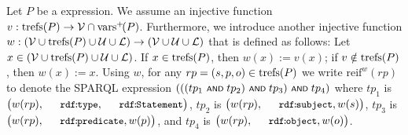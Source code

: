 Let $P$ be a {\SPARQLplus} expression. We assume an  injective function $v : \mathrm{trefs}(P) \rightarrow \mathcal{V} \cap \mathrm{vars}^+\!(P)$. Furthermore, we introduce another injective function $w : (\mathcal{V} \cup \mathrm{trefs}(P) \cup \mathcal{U} \cup \mathcal{L}) \rightarrow (\mathcal{V} \cup \mathcal{U} \cup \mathcal{L})$ that is defined as follows: Let $x \in (\mathcal{V} \cup \mathrm{trefs}(P) \cup \mathcal{U} \cup \mathcal{L})$. If $x \in \mathrm{trefs}(P)$, then $w(x) := v(x)$; if $v \notin \mathrm{trefs}(P)$, then $w(x) := x$.
%
Using $w$, for any $rp = (s,p,o) \in \mathrm{trefs}(P)$ we write $\mathrm{reif}^w( rp )$ to denote
	the SPARQL expression $( ( ( tp_1 \text{ \normalfont\scriptsize\textsf{AND} } tp_2 ) \text{ \normalfont\scriptsize\textsf{AND} } tp_3 ) \text{ \normalfont\scriptsize\textsf{AND} } tp_4 )$ where $tp_1$ is $\bigl(w(rp),\mathTinyRDF{rdf\!:\!type},\mathTinyRDF{rdf\!:\!Statement}\bigr)$, $tp_2$ is $\bigl(w(rp),\mathTinyRDF{rdf\!:\!subject},w(s)\bigr)$, $tp_3$ is $\bigl(w(rp),\mathTinyRDF{rdf\!:\!predicate},w(p)\bigr)$, and $tp_4$ is $\bigl(w(rp),\mathTinyRDF{rdf\!:\!object},w(o)\bigr)$.

